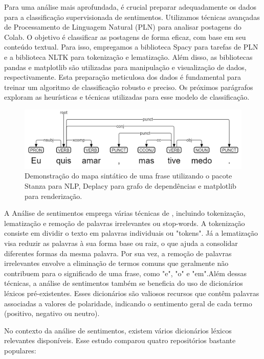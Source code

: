 Para uma análise mais aprofundada, é crucial preparar adequadamente os dados para a classificação supervisionada de sentimentos. Utilizamos técnicas avançadas de Processamento de Linguagem Natural (PLN) para analisar postagens do Colab. O objetivo é classificar as postagens de forma eficaz, com base em seu conteúdo textual. Para isso, empregamos a biblioteca Spacy para tarefas de PLN e a biblioteca NLTK para tokenização e lematização. Além disso, as bibliotecas pandas e matplotlib são utilizadas para manipulação e visualização de dados, respectivamente. Esta preparação meticulosa dos dados é fundamental para treinar um algoritmo de classificação robusto e preciso. Os próximos parágrafos exploram as heurísticas e técnicas utilizadas para esse modelo de classificação.

\begin{figure}[!htb]
	\caption{Demonstração do mapa sintático de uma frase utilizando o pacote Stanza para NLP, Deplacy para grafo de dependências e matplotlib para renderização.}
	\label{fig:lexicon_breakdown}
	\centering
	\includegraphics[scale=0.5]{images/lexicon_breakdown.png}
	\fautor
\end{figure}

A Análise de sentimentos emprega várias técnicas de , incluindo tokenização, lematização e remoção de palavras irrelevantes ou stop-words. A tokenização consiste em dividir o texto em palavras individuais ou "tokens". Já a lematização visa reduzir as palavras à sua forma base ou raiz, o que ajuda a consolidar diferentes formas da mesma palavra. Por sua vez, a remoção de palavras irrelevantes envolve a eliminação de termos comuns que geralmente não contribuem para o significado de uma frase, como "e", "o" e "em".Além dessas técnicas, a análise de sentimentos também se beneficia do uso de dicionários léxicos pré-existentes. Esses dicionários são valiosos recursos que contêm palavras associadas a valores de polaridade, indicando o sentimento geral de cada termo (positivo, negativo ou neutro).

No contexto da análise de sentimentos, existem vários dicionários léxicos relevantes disponíveis. Esse estudo comparou quatro repositórios bastante populares:

